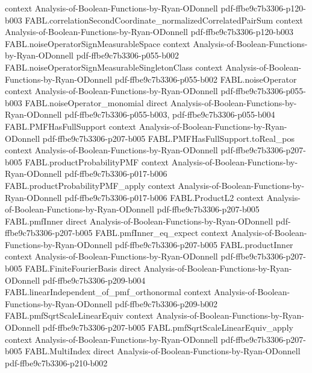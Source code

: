 \begin{theorem}
  {context}
  {Analysis-of-Boolean-Functions-by-Ryan-ODonnell}
  {pdf-ffbe9c7b3306-p120-b003}
\proofstep
  {FABL.correlationSecondCoordinate_normalizedCorrelatedPairSum}
  {context}
  {Analysis-of-Boolean-Functions-by-Ryan-ODonnell}
  {pdf-ffbe9c7b3306-p120-b003}
\proofstep
  {FABL.noiseOperatorSignMeasurableSpace}
  {context}
  {Analysis-of-Boolean-Functions-by-Ryan-ODonnell}
  {pdf-ffbe9c7b3306-p055-b002}
\proofstep
  {FABL.noiseOperatorSignMeasurableSingletonClass}
  {context}
  {Analysis-of-Boolean-Functions-by-Ryan-ODonnell}
  {pdf-ffbe9c7b3306-p055-b002}
\proofstep
  {FABL.noiseOperator}
  {context}
  {Analysis-of-Boolean-Functions-by-Ryan-ODonnell}
  {pdf-ffbe9c7b3306-p055-b003}
\proofstep
  {FABL.noiseOperator_monomial}
  {direct}
  {Analysis-of-Boolean-Functions-by-Ryan-ODonnell}
  {pdf-ffbe9c7b3306-p055-b003,
    pdf-ffbe9c7b3306-p055-b004}
\proofstep
  {FABL.PMFHasFullSupport}
  {context}
  {Analysis-of-Boolean-Functions-by-Ryan-ODonnell}
  {pdf-ffbe9c7b3306-p207-b005}
\proofstep
  {FABL.PMFHasFullSupport.toReal_pos}
  {context}
  {Analysis-of-Boolean-Functions-by-Ryan-ODonnell}
  {pdf-ffbe9c7b3306-p207-b005}
\proofstep
  {FABL.productProbabilityPMF}
  {context}
  {Analysis-of-Boolean-Functions-by-Ryan-ODonnell}
  {pdf-ffbe9c7b3306-p017-b006}
\proofstep
  {FABL.productProbabilityPMF_apply}
  {context}
  {Analysis-of-Boolean-Functions-by-Ryan-ODonnell}
  {pdf-ffbe9c7b3306-p017-b006}
\proofstep
  {FABL.ProductL2}
  {context}
  {Analysis-of-Boolean-Functions-by-Ryan-ODonnell}
  {pdf-ffbe9c7b3306-p207-b005}
\proofstep
  {FABL.pmfInner}
  {direct}
  {Analysis-of-Boolean-Functions-by-Ryan-ODonnell}
  {pdf-ffbe9c7b3306-p207-b005}
\proofstep
  {FABL.pmfInner_eq_expect}
  {context}
  {Analysis-of-Boolean-Functions-by-Ryan-ODonnell}
  {pdf-ffbe9c7b3306-p207-b005}
\proofstep
  {FABL.productInner}
  {context}
  {Analysis-of-Boolean-Functions-by-Ryan-ODonnell}
  {pdf-ffbe9c7b3306-p207-b005}
\proofstep
  {FABL.FiniteFourierBasis}
  {direct}
  {Analysis-of-Boolean-Functions-by-Ryan-ODonnell}
  {pdf-ffbe9c7b3306-p209-b004}
\proofstep
  {FABL.linearIndependent_of_pmf_orthonormal}
  {context}
  {Analysis-of-Boolean-Functions-by-Ryan-ODonnell}
  {pdf-ffbe9c7b3306-p209-b002}
\proofstep
  {FABL.pmfSqrtScaleLinearEquiv}
  {context}
  {Analysis-of-Boolean-Functions-by-Ryan-ODonnell}
  {pdf-ffbe9c7b3306-p207-b005}
\proofstep
  {FABL.pmfSqrtScaleLinearEquiv_apply}
  {context}
  {Analysis-of-Boolean-Functions-by-Ryan-ODonnell}
  {pdf-ffbe9c7b3306-p207-b005}
\proofstep
  {FABL.MultiIndex}
  {direct}
  {Analysis-of-Boolean-Functions-by-Ryan-ODonnell}
  {pdf-ffbe9c7b3306-p210-b002}

\end{theorem}
